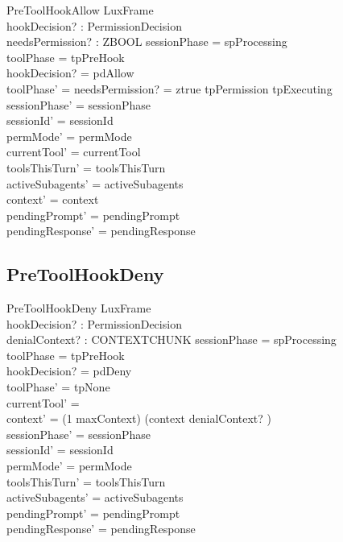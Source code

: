 \documentclass[a4paper,10pt,fleqn]{article}
\begin{document}
\begin{schema}{PreToolHookAllow}
  LuxFrame \\
  hookDecision? : PermissionDecision \\
  needsPermission? : ZBOOL
  \where
  sessionPhase = spProcessing \\
  toolPhase = tpPreHook \\
  hookDecision? = pdAllow \\
  toolPhase' = \IF needsPermission? = ztrue \THEN tpPermission \ELSE tpExecuting \\
  sessionPhase' = sessionPhase \\
  sessionId' = sessionId \\
  permMode' = permMode \\
  currentTool' = currentTool \\
  toolsThisTurn' = toolsThisTurn \\
  activeSubagents' = activeSubagents \\
  context' = context \\
  pendingPrompt' = pendingPrompt \\
  pendingResponse' = pendingResponse
\end{schema}

\subsection{PreToolHookDeny}

\begin{schema}{PreToolHookDeny}
  LuxFrame \\
  hookDecision? : PermissionDecision \\
  denialContext? : CONTEXTCHUNK
  \where
  sessionPhase = spProcessing \\
  toolPhase = tpPreHook \\
  hookDecision? = pdDeny \\
  toolPhase' = tpNone \\
  currentTool' = \emptyset \\
  context' = (1 \upto maxContext) \dres (context \cat \langle denialContext? \rangle) \\
  sessionPhase' = sessionPhase \\
  sessionId' = sessionId \\
  permMode' = permMode \\
  toolsThisTurn' = toolsThisTurn \\
  activeSubagents' = activeSubagents \\
  pendingPrompt' = pendingPrompt \\
  pendingResponse' = pendingResponse
\end{schema}
\end{document}
